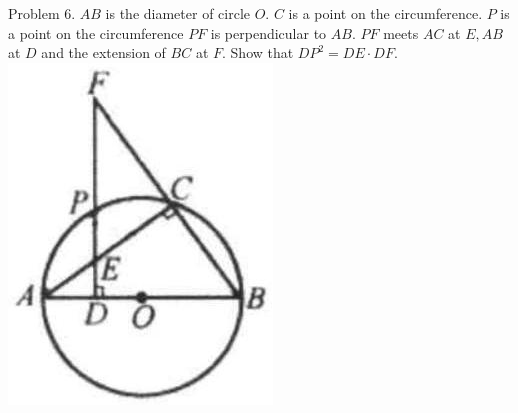 \documentclass[10pt]{article}
\begin{document}
Problem 6. \(A B\) is the diameter of circle \(O\). \(C\) is a point on the circumference. \(P\) is a point on the circumference \(P F\) is perpendicular to \(A B\). \(P F\) meets \(A C\) at \(E, A B\) at \(D\) and the extension of \(B C\) at \(F\). Show that \(D P^{2}=D E \cdot D F\).\\
\includegraphics[max width=\textwidth, center]{2025_04_17_97bc1f7e44d93c271a88g-170(2)}
\end{document}
